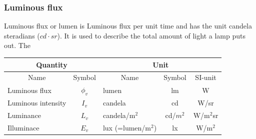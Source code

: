 \subsubsection{Luminous flux}
Luminous flux or lumen is Luminous flux per unit time and has the unit candela steradians ($cd\cdot sr$). It is used to describe the total amount of light a lamp puts out. The 
\begin{table}[ht]
	\centering
	\begin{tabular}{ |p{5cm} p{2cm}|p{5cm} p{2cm} p{2cm}|  }
		\hline
		\multicolumn{2}{|c}{Quantity}&\multicolumn{3}{|c|}{Unit} \\
		\hline\hline
		\multicolumn{1}{|c}{Name}			& \multicolumn{1}{|c|}{Symbol}	& \multicolumn{1}{c}{Name}	& \multicolumn{1}{|c|}{Symbol}	& \multicolumn{1}{|c|}{SI-unit}\\
		
		\hline
		Luminous flux		& \multicolumn{1}{|c|}{$\phi_v$}	& lumen		& \multicolumn{1}{|c|}{lm}& \multicolumn{1}{|c|}{W}\\
		Luminous intensity 	& \multicolumn{1}{|c|}{$I_v$} 		& candela	& \multicolumn{1}{|c|}{cd}& \multicolumn{1}{|c|}{W/sr}\\
		Luminance			& \multicolumn{1}{|c|}{$L_v$}		& candela/$\text{m}^2$	& \multicolumn{1}{|c|}{cd/$m^2$}& \multicolumn{1}{|c|}{W/$\text{m}^2$sr}\\
		Illuminace 			& \multicolumn{1}{|c|}{$E_v$} 		& lux (=lumen/$\text{m}^2$) 	& \multicolumn{1}{|c|}{lx}& \multicolumn{1}{|c|}{W/$\text{m}^2$}\\
		
		\hline
	\end{tabular}
\end{table}


\lipsum[4]\\


